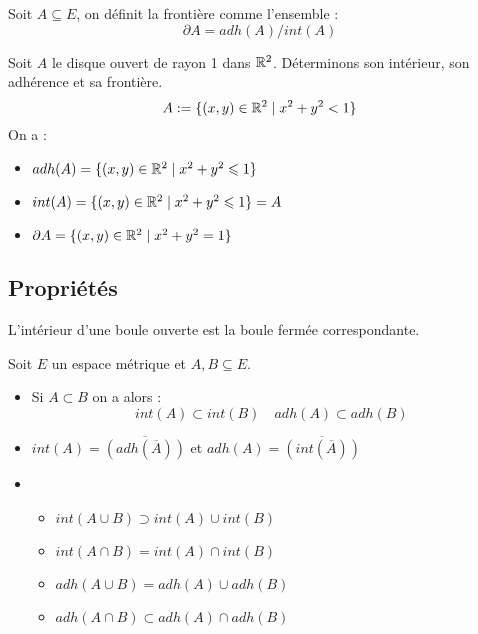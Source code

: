 \begin{definition}[Frontière]
    Soit $A \subseteq E$, on définit la frontière comme l'ensemble :
        \[ \partial A = adh(A) / int(A) \] 
\end{definition}

\begin{example}
    Soit $A$ le disque ouvert de rayon 1 dans $\mathbb{R}^2$. Déterminons son intérieur, son adhérence et sa frontière. 
        \[ A := \{ (x,y) \in \mathbb{R}^2 \; | \; x^2 + y^2 < 1 \} \] 
    On a : 
    \begin{itemize}
        \item $adh(A) = \{ (x,y) \in \mathbb{R}^2 \; | \; x^2 + y^2 \leqslant 1 \} $
        \item $int(A) = \{ (x,y) \in \mathbb{R}^2 \; | \; x^2 + y^2 \leqslant 1 \} = A $
        \item $\partial A = \{ (x,y) \in \mathbb{R}^2 \; | \; x^2 + y^2 = 1 \} $
    \end{itemize}
\end{example}


\subsection{Propriétés}

\begin{proposition}
    L'intérieur d'une boule ouverte est la boule fermée correspondante. 
\end{proposition}

\begin{prop}
    Soit $E$ un espace métrique et $A,B \subseteq E$. 
    \begin{itemize}
        \item Si $A \subset B$ on a alors :
            \[ int(A) \subset int(B) \quad adh(A) \subset adh(B) \] 
        \item $int(A) = \overline{(adh(\overline{A}))} $ et $ adh(A) = \overline{(int(\overline{A}))}$ 
        \item 
        \begin{itemize}
            \item $ int(A \cup B) \supset int(A) \cup int(B) $
            \item $ int(A \cap B) = int(A) \cap int(B) $
            \item $ adh(A \cup B) = adh(A) \cup adh(B) $
            \item $ adh(A \cap B) \subset adh(A) \cap adh(B) $
        \end{itemize}
    \end{itemize}
\end{prop}

